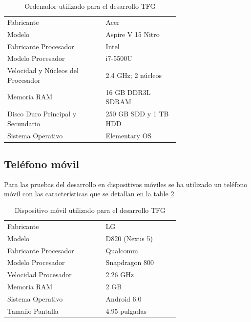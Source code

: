 	\begin{table}[H]
	  \centering 
	  \begin{tabular}{p{0.4\linewidth}p{0.3\linewidth}}
	    \toprule
	    Fabricante 							& Acer 											\\
	    Modelo								& Aspire V 15 Nitro								\\
		Fabricante Procesador 				& Intel 										\\
		Modelo Procesador 					& i7-5500U 										\\
		Velocidad y Núcleos del Procesador & 2.4 GHz; 2 núcleos 							\\
		Memoria RAM 						& 16 \ac{GB} \ac{DDR}3L \ac{SDRAM} 			\\
		Disco Duro Principal y Secundario 	& 250 \ac{GB} \ac{SDD} y 1 \ac{TB} \ac{HDD}	\\
		Sistema Operativo					& Elementary \ac{OS} 							\\
	    \hline
	  \end{tabular}
	  \caption{Ordenador utilizado para el desarrollo \ac{TFG}}
	  \label{tab:portatil}
	\end{table}
	
	\subsection{Teléfono móvil}
	
	Para las pruebas del desarrollo en dispositivos móviles se ha utilizado un teléfono móvil con las características que se detallan en la table \ref{tab:movil}.
	
	\begin{table}[H]
	  \centering 
	  \begin{tabular}{p{0.4\linewidth}p{0.3\linewidth}}
	    \toprule
	    Fabricante 				& LG 				\\
	    Modelo 					& D820 (Nexus 5) 	\\
		Fabricante Procesador 	& Qualcomm 			\\
		Modelo Procesador 		& Snapdragon 800 	\\
		Velocidad Procesador 	& 2.26 GHz 			\\
		Memoria RAM 			& 2 \ac{GB} 		\\
		Sistema Operativo 		& Android 6.0 		\\
		Tamaño Pantalla			& 4.95 pulgadas 	\\
	    \hline
	  \end{tabular}
	  \caption{Dispositivo móvil utilizado para el desarrollo \ac{TFG}}
	  \label{tab:movil}
	\end{table}

